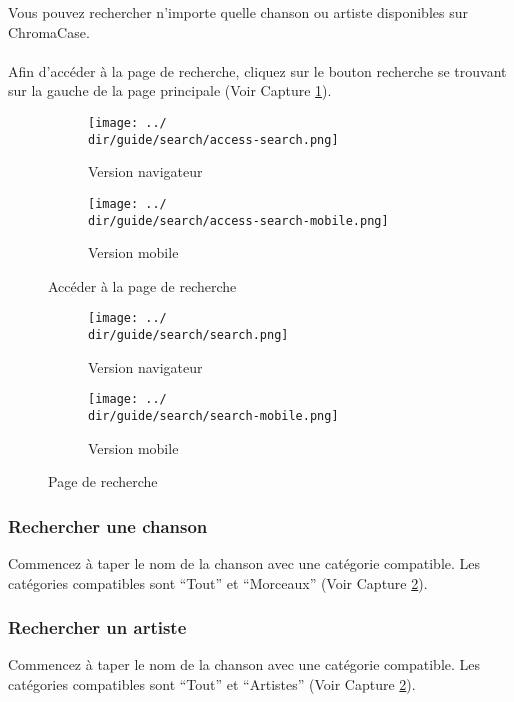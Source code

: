 Vous pouvez rechercher n'importe quelle chanson ou artiste disponibles sur ChromaCase.
\\\\
Afin d’accéder à la page de recherche, cliquez sur le bouton recherche se trouvant sur la gauche de la page principale (Voir Capture \ref{fig:access-search}).

\begin{figure}[H]
	\begin{subfigure}[b]{0.7\textwidth}
		\texttt{[image: ../\\dir/guide/search/access-search.png]}
		\caption{Version navigateur}
	\end{subfigure}
	\begin{subfigure}[b]{0.25\textwidth}
		\texttt{[image: ../\\dir/guide/search/access-search-mobile.png]}
		\caption{Version mobile}
	\end{subfigure}
	\caption{Accéder à la page de recherche}
	\label{fig:access-search}
\end{figure}
\begin{figure}[H]
	\begin{subfigure}[b]{0.7\textwidth}
		\texttt{[image: ../\\dir/guide/search/search.png]}
		\caption{Version navigateur}
	\end{subfigure}
	\begin{subfigure}[b]{0.25\textwidth}
		\texttt{[image: ../\\dir/guide/search/search-mobile.png]}
		\caption{Version mobile}
	\end{subfigure}
	\caption{Page de recherche}
	\label{fig:search}
\end{figure}

\subsubsection{Rechercher une chanson}
Commencez à taper le nom de la chanson avec une catégorie compatible. Les catégories compatibles sont “Tout” et “Morceaux” (Voir Capture \ref{fig:search}).

\subsubsection{Rechercher un artiste}
Commencez à taper le nom de la chanson avec une catégorie compatible. Les catégories compatibles sont “Tout” et “Artistes” (Voir Capture \ref{fig:search}).